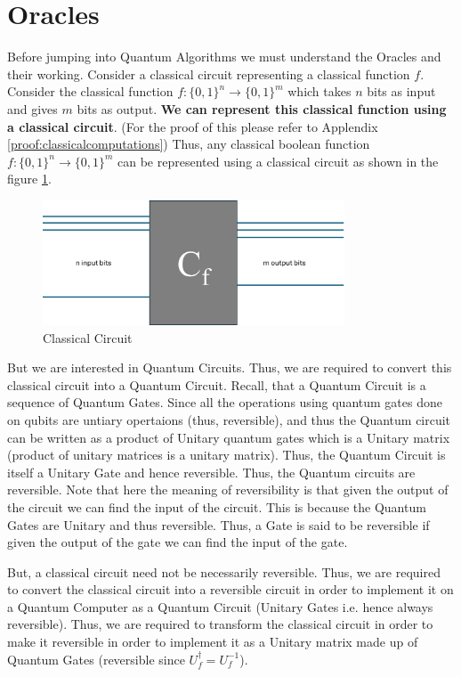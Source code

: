 \documentclass[12pt, oneside]{book}
\theoremstyle{definition}
\theoremstyle{definition}
\theoremstyle{remark}
\begin{document}
\section{Oracles}\label{sec:Oracles}
Before jumping into Quantum Algorithms we must understand the Oracles and their working.
Consider a classical circuit representing a classical function $f$. 
Consider the classical function $f:\{0,1\}^n \rightarrow \{0,1\}^m$ which takes $n$ bits as input and gives $m$ bits as output.
\textbf{We can represent this classical function using a classical circuit}. (For the proof of this please refer to Applendix \ref{proof:classicalcomputations})
Thus, any classical boolean function $f:\{0,1\}^n \rightarrow \{0,1\}^m$ can be represented using a classical circuit as shown in the figure \ref{classicalcircuit}.
\begin{figure}[H]
    \centering
    \includegraphics[width=0.8\textwidth]{../images/classicalcircuit.png}
    \caption{Classical Circuit}
    \label{classicalcircuit}
\end{figure}
But we are interested in Quantum Circuits. Thus, we are required to convert this classical circuit into a Quantum Circuit.
Recall, that a Quantum Circuit is a sequence of Quantum Gates. Since all the operations using quantum gates done on qubits  are untiary opertaions (thus, reversible),
and thus the Quantum circuit can be written as a product of Unitary quantum gates which is a Unitary matrix (product of unitary matrices is a unitary matrix). Thus, the Quantum Circuit is itself a Unitary Gate and hence reversible. Thus, the Quantum circuits are reversible.
Note that here the meaning of reversibility is that given the output of the circuit we can find the input of the circuit. This is because the Quantum Gates are Unitary and thus reversible.
Thus, a Gate is said to be reversible if given the output of the gate we can find the input of the gate. 

But, a classical circuit need not be necessarily reversible. Thus, we are required to convert the classical circuit into a reversible circuit in order to implement it on a Quantum Computer as a Quantum Circuit (Unitary Gates i.e. hence always reversible).
Thus, we are required to transform the classical circuit in order to make it reversible in order to implement it as a Unitary matrix made up of Quantum Gates (reversible since $U_f^{\dagger}=U_f^{-1}$).
\end{document}
